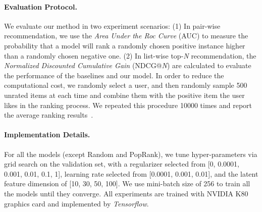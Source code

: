 \documentclass{article}
\begin{document}
\paragraph{Evaluation Protocol.} We evaluate our method in two experiment scenarios: 
(1) In pair-wise recommendation, we use the \textit{Area Under the Roc Curve} (AUC) \cite{rendle2009bpr} to measure the probability that a model will rank a randomly chosen positive instance higher than a randomly chosen negative one.
(2) In list-wise top-\textit{N} recommendation, the \textit{Normalized Discounted Cumulative Gain} (NDCG@\textit{N}) are calculated to evaluate the performance of the baselines and our model. In order to reduce the computational cost, we randomly select a user, and then randomly sample 500 unrated items at each time and combine them with the positive item the user likes in the ranking process. We repeated this procedure 10000 times and report the average ranking results~\cite{wu2017modeling}.
\paragraph{Implementation Details.}  For all the models (except Random and PopRank), we tune hyper-parameters via grid search on the validation set, with a regularizer selected from [0, 0.0001, 0.001, 0.01, 0.1, 1], learning rate selected from [0.0001, 0.001, 0.01], and the latent feature dimension of [10, 30, 50, 100]. We use mini-batch size of 256 to train all the models until they converge. All experiments are trained with NVIDIA K80 graphics card and implemented by \textit{Tensorflow}. 
\end{document}
